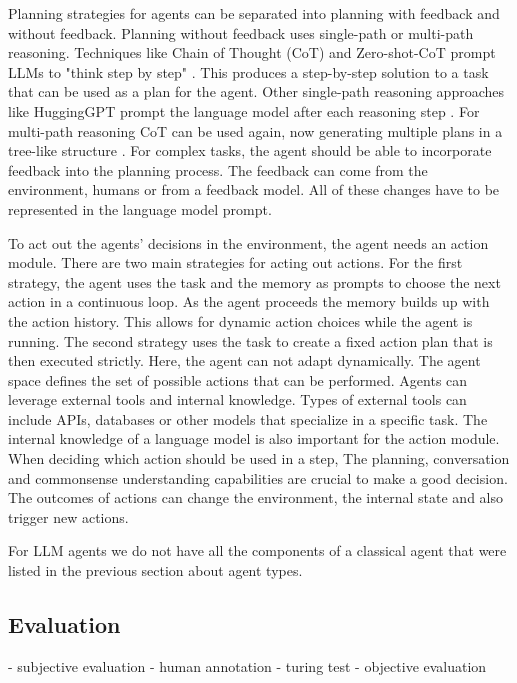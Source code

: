 \documentclass[../main.tex]{subfiles}
\begin{document}
Planning strategies for agents can be separated into planning with feedback
and without feedback.
Planning without feedback uses single-path or multi-path reasoning.
Techniques like Chain of Thought (CoT) and Zero-shot-CoT prompt LLMs
to "think step by step" \cite{Wei2022}.
This produces a step-by-step solution to a task that can be used as a plan
for the agent.
Other single-path reasoning approaches like HuggingGPT
prompt the language model after each reasoning step \cite{Shen2023}.
For multi-path reasoning CoT can be used again, now generating multiple plans
in a tree-like structure \cite{Yao2023}.
For complex tasks, the agent should be able to incorporate feedback into
the planning process.
The feedback can come from the environment, humans or from a feedback model.
All of these changes have to be represented in the language model prompt.

To act out the agents' decisions in the environment, the agent needs an
action module.
There are two main strategies for acting out actions.
For the first strategy,
the agent uses the task and the memory as prompts
to choose the next action in a continuous loop.
As the agent proceeds the memory builds up with the action history.
This allows for dynamic action choices while the agent is running.
The second strategy uses the task to create a fixed action plan
that is then executed strictly.
Here, the agent can not adapt dynamically.
The agent space defines the set of possible actions that can be performed.
Agents can leverage external tools and internal knowledge.
Types of external tools can include APIs, databases or other models
that specialize in a specific task.
The internal knowledge of a language model is also important for the action module.
When deciding which action should be used in a step,
The planning, conversation and commonsense understanding capabilities
are crucial to make a good decision.
The outcomes of actions can change the environment, the internal state and
also trigger new actions.

For LLM agents we do not have all the components of a classical agent
that were listed in the previous section about agent types.
\autocite{SignificantGravitas2024}

\subsection{Evaluation}

- subjective evaluation
- human annotation
- turing test
- objective evaluation
\end{document}
